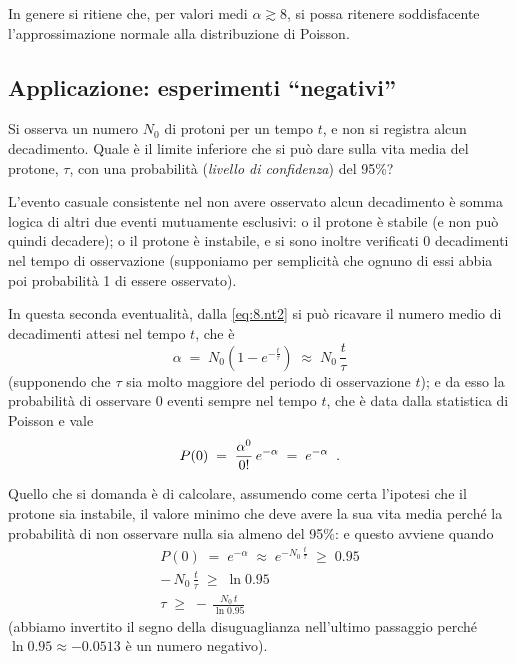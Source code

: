 In genere si ritiene che, per valori medi $\alpha \gtrsim
8$, si possa ritenere soddisfacente l'approssimazione
normale alla distribuzione di Poisson.%
%

\subsection{Applicazione: esperimenti ``negativi''}
Si osserva un numero $N_0$ di protoni per un tempo $t$, e
non si registra alcun decadimento.  Quale \`e il limite
inferiore che si pu\`o dare sulla vita media del protone,
$\tau$, con una probabilit\`a (\emph{livello di confidenza})
del 95\%?

L'evento casuale consistente nel non avere osservato alcun
decadimento \`e somma logica di altri due eventi mutuamente
esclusivi: o il protone \`e stabile (e non pu\`o quindi
decadere); o il protone \`e instabile, e si sono inoltre
verificati 0 decadimenti nel tempo di osservazione
(supponiamo per semplicit\`a che ognuno di essi abbia poi
probabilit\`a 1 di essere osservato).

In questa seconda eventualit\`a, dalla \eqref{eq:8.nt2} si
pu\`o ricavare il numero medio di decadimenti attesi nel
tempo $t$, che \`e
\begin{equation*}
  \alpha \; = \; N_0 \left( 1 -
    e^{-\frac{t}{\tau}} \right) \; \approx
    \; N_0 \, \frac{t}{\tau}
\end{equation*}
(supponendo che $\tau$ sia molto maggiore del periodo di
osservazione $t$); e da esso la probabilit\`a di osservare 0
eventi sempre nel tempo $t$, che \`e data dalla statistica
di Poisson e vale
\begin{equation*}
  P(0) \; = \; \frac{\alpha^0}{0!} \,
    e^{-\alpha} \; = \; e^{-\alpha} \;\; .
\end{equation*}

Quello che si domanda \`e di calcolare, assumendo come certa
l'ipotesi che il protone sia instabile, il valore minimo che
deve avere la sua vita media perch\'e la probabilit\`a di
non osservare nulla sia almeno del 95\%: e questo avviene
quando
\begin{gather*}
  P(0) \; = \; e^{-\alpha} \; \approx \;
    e^{-N_0 \, \frac{t}{\tau}} \; \ge \;
    0.95 \\[1ex]
  - \, N_0 \, \frac{t}{\tau} \; \ge \;
    \ln 0.95 \\[1ex]
  \tau \; \ge \; - \, \frac{N_0 \, t}{\ln 0.95}
\end{gather*}
(abbiamo invertito il segno della disuguaglianza nell'ultimo
passaggio perch\'e $\ln 0.95 \approx -0.0513$ \`e un numero
negativo).

